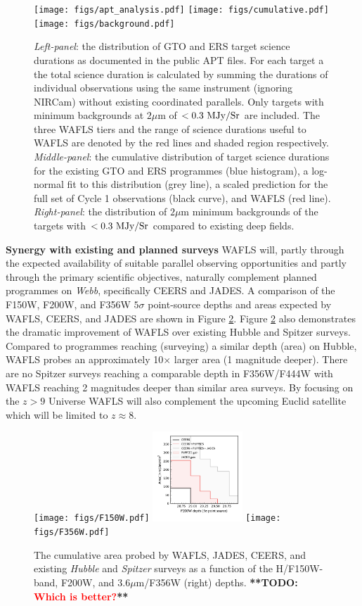 \documentclass[12pt]{article}
\newcommand{\todo}[1]{\textbf{**TODO: \textcolor{red}{#1}**}}
\begin{document}
\begin{figure}
    \centering
    \texttt{[image: figs/apt\_analysis.pdf]}
    \texttt{[image: figs/cumulative.pdf]}
    \texttt{[image: figs/background.pdf]}
    \caption{\textit{Left-panel}: the distribution of GTO and ERS target science durations as documented in the public APT files. For each target a the total science duration is calculated by summing the durations of individual observations using the same instrument (ignoring NIRCam) without existing coordinated parallels. Only targets with minimum backgrounds at $2\mu$m of $<0.3\ {\rm MJy/Sr}$ are included. The three WAFLS tiers and the range of science durations useful to WAFLS are denoted by the red lines and shaded region respectively. \textit{Middle-panel}: the cumulative distribution of target science durations for the existing GTO and ERS programmes (blue histogram), a log-normal fit to this distribution (grey line), a scaled prediction for the full set of Cycle 1 observations (black curve), and WAFLS (red line). \textit{Right-panel}: the distribution of $2\mu$m minimum backgrounds of the targets with $<0.3\ {\rm MJy/Sr}$ compared to existing deep fields.}
    \label{fig:apt}
\end{figure}

\noindent
\textbf{Synergy with existing and planned surveys} WAFLS will, partly through the expected availability of suitable parallel observing opportunities and partly through the primary scientific objectives, naturally complement planned programmes on \emph{Webb}, specifically CEERS and JADES. A comparison of the F150W, F200W, and F356W $5\sigma$ point-source depths and areas expected by WAFLS, CEERS, and JADES are shown in Figure \ref{fig:depth}. Figure \ref{fig:depth} also demonstrates the dramatic improvement of WAFLS over existing Hubble and Spitzer surveys. Compared to programmes reaching (surveying) a similar depth (area) on Hubble, WAFLS probes an approximately 10$\times$ larger area (1 magnitude deeper). There are no Spitzer surveys reaching a comparable depth in F356W/F444W with WAFLS reaching 2 magnitudes deeper than similar area surveys. By focusing on the $z>9$ Universe WAFLS will also complement the upcoming Euclid satellite which will be limited to $z\approx 8$.

\begin{figure}[!h]
    \centering
    \texttt{[image: figs/F150W.pdf]}
    \includegraphics[width=0.3\textwidth]{figs/F200W.pdf}
    \texttt{[image: figs/F356W.pdf]}
    \caption{The cumulative area probed by WAFLS, JADES, CEERS, and existing \emph{Hubble} and \emph{Spitzer} surveys as a function of the H/F150W-band, F200W, and $3.6\mu$m/F356W (right) depths. \todo{Which is better?}}
    \label{fig:depth}
\end{figure}
\end{document}
